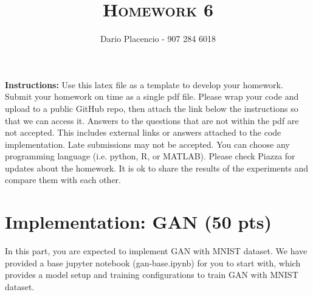 \documentclass[a4paper]{article}
\title{\textsc{Homework 6}} %
\author{Dario Placencio - 907 284 6018}
\date{}
\theoremstyle{definition}
\begin{document}
	
	\maketitle 
	
        \textbf{Instructions:}
        Use this latex file as a template to develop your homework. Submit your homework on time as a single pdf file. Please wrap your code and upload to a public GitHub repo, then attach the link below the instructions so that we can access it. Answers to the questions that are not within the pdf are not accepted. This includes external links or answers attached to the code implementation. Late submissions may not be accepted. You can choose any programming language (i.e. python, R, or MATLAB). Please check Piazza for updates about the homework. It is ok to share the results of the experiments and compare them with each other.
        \vspace{0.1in}
	
	\section{Implementation: GAN (50 pts)}
	In this part, you are expected to implement GAN with MNIST dataset. We have provided a base jupyter notebook (gan-base.ipynb) for you to start with, which provides a model setup and training configurations to train GAN with MNIST dataset.
	
\end{document}
